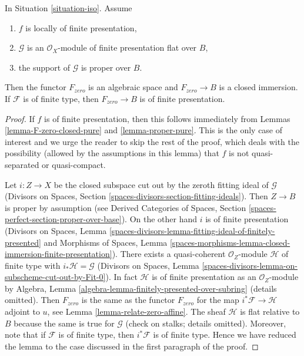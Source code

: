 \begin{lemma}
\label{lemma-F-zero-closed-proper}
In Situation \ref{situation-iso}. Assume
\begin{enumerate}
\item $f$ is locally of finite presentation,
\item $\mathcal{G}$ is an $\mathcal{O}_X$-module of finite presentation
flat over $B$,
\item the support of $\mathcal{G}$ is proper over $B$.
\end{enumerate}
Then the functor $F_{zero}$ is an algebraic space and $F_{zero} \to B$
is a closed immersion. If $\mathcal{F}$ is of finite type, then
$F_{zero} \to B$ is of finite presentation.
\end{lemma}

\begin{proof}
If $f$ is of finite presentation, then this follows immediately from
Lemmas \ref{lemma-F-zero-closed-pure} and \ref{lemma-proper-pure}.
This is the only case of interest and we urge the reader to skip
the rest of the proof, which deals with the possibility (allowed
by the assumptions in this lemma)
that $f$ is not quasi-separated or quasi-compact.

\medskip\noindent
Let $i : Z \to X$ be the closed subspace cut out by the zeroth
fitting ideal of $\mathcal{G}$
(Divisors on Spaces, Section
\ref{spaces-divisors-section-fitting-ideals}).
Then $Z \to B$ is proper by assumption (see
Derived Categories of Spaces, Section
\ref{spaces-perfect-section-proper-over-base}).
On the other hand $i$ is of finite presentation
(Divisors on Spaces, Lemma
\ref{spaces-divisors-lemma-fitting-ideal-of-finitely-presented} and
Morphisms of Spaces, Lemma
\ref{spaces-morphisms-lemma-closed-immersion-finite-presentation}).
There exists a quasi-coherent $\mathcal{O}_Z$-module
$\mathcal{H}$ of finite type with $i_*\mathcal{H} = \mathcal{G}$
(Divisors on Spaces, Lemma
\ref{spaces-divisors-lemma-on-subscheme-cut-out-by-Fit-0}).
In fact $\mathcal{H}$ is of finite presentation as an $\mathcal{O}_Z$-module
by Algebra, Lemma \ref{algebra-lemma-finitely-presented-over-subring}
(details omitted).
Then $F_{zero}$ is the same as the functor $F_{zero}$
for the map $i^*\mathcal{F} \to \mathcal{H}$ adjoint to $u$, see
Lemma \ref{lemma-relate-zero-affine}.
The sheaf $\mathcal{H}$ is flat relative to $B$ because
the same is true for $\mathcal{G}$ (check on stalks; details omitted).
Moreover, note that if $\mathcal{F}$ is of finite type,
then $i^*\mathcal{F}$ is of finite type.
Hence we have reduced the lemma to the case
discussed in the first paragraph of the proof.
\end{proof}








